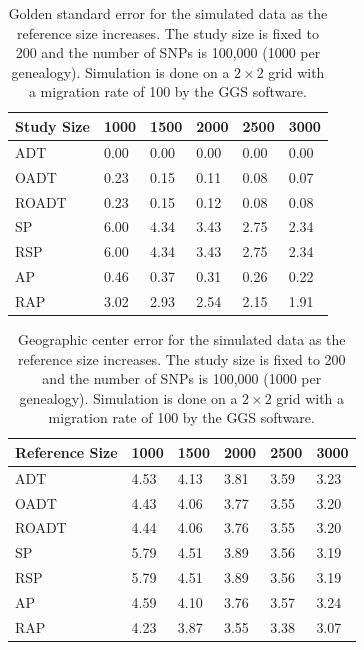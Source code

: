 \documentclass{article}
\begin{document}
\begin{table}
  \centering
  \begin{tabular}{|l|l|l|l|l|l|}
    \hline
    Study Size & 1000  & 1500 & 2000 & 2500 & 3000 \\
    \hline
    ADT        & 0.00  & 0.00 & 0.00 & 0.00 & 0.00 \\
    OADT       & 0.23  & 0.15 & 0.11 & 0.08 & 0.07 \\
    ROADT      & 0.23  & 0.15 & 0.12 & 0.08 & 0.08 \\
    SP         & 6.00  & 4.34 & 3.43 & 2.75 & 2.34 \\
    RSP        & 6.00  & 4.34 & 3.43 & 2.75 & 2.34 \\
    AP         & 0.46  & 0.37 & 0.31 & 0.26 & 0.22 \\
    RAP        & 3.02  & 2.93 & 2.54 & 2.15 & 1.91 \\
    \hline
  \end{tabular}
  \caption{
    Golden standard error for the simulated data as the reference size increases.
    The study size is fixed to 200 and the number of SNPs is 100,000 (1000 per genealogy). 
    Simulation is done on a $2 \times 2$ grid with a migration rate of 100 by the GGS software. 
  }
  \label{tbl:nChg-accuracy-gold}
\end{table}

\begin{table}
  \centering
  \begin{tabular}{|l|l|l|l|l|l|}
    \hline
    Reference Size & 1000  & 1500 & 2000 & 2500 & 3000 \\
    \hline
    ADT        & 4.53  & 4.13 & 3.81 & 3.59 & 3.23 \\
    OADT       & 4.43  & 4.06 & 3.77 & 3.55 & 3.20 \\
    ROADT      & 4.44  & 4.06 & 3.76 & 3.55 & 3.20 \\
    SP         & 5.79  & 4.51 & 3.89 & 3.56 & 3.19 \\
    RSP        & 5.79  & 4.51 & 3.89 & 3.56 & 3.19 \\
    AP         & 4.59  & 4.10 & 3.76 & 3.57 & 3.24 \\
    RAP        & 4.23  & 3.87 & 3.55 & 3.38 & 3.07 \\
    \hline
  \end{tabular}
  \caption{
    Geographic center error for the simulated data as the reference size increases.
    The study size is fixed to 200 and the number of SNPs is 100,000 (1000 per genealogy). 
    Simulation is done on a $2 \times 2$ grid with a migration rate of 100 by the GGS software. 
  }
  \label{tbl:nChg-accuracy-ctr}
\end{table}
\end{document}
